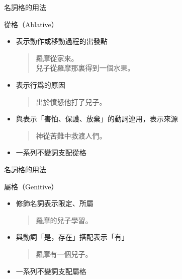 \documentclass[aspectratio=169]{beamer}
\begin{document}
\begin{frame}{名詞格的用法}
    \begin{block}{從格（Ablative）}
        \begin{itemize}
            \item 表示動作或移動過程的出發點\\
            \begin{quotation}
                \rmfamily
                 羅摩從家來。\\
                 兒子從羅摩那裏得到一個水果。
            \end{quotation}
            \item 表示行爲的原因\\
            \begin{quotation}
                \rmfamily
                 出於憤怒他打了兒子。
            \end{quotation}
            \item 與表示「害怕、保護、放棄」的動詞連用，表示來源\\
            \begin{quotation}
                \rmfamily
                 神從苦難中救渡人們。
            \end{quotation}
            \item 一系列不變詞支配從格
        \end{itemize}
    \end{block}
\end{frame}

\begin{frame}{名詞格的用法}
    \begin{block}{屬格（Genitive）}
        \begin{itemize}
            \item 修飾名詞表示限定、所屬\\
            \begin{quotation}
                \rmfamily
                 羅摩的兒子學習。
            \end{quotation}
            \item 與動詞「是，存在」搭配表示「有」\\
            \begin{quotation}
                \rmfamily
                 羅摩有一個兒子。
            \end{quotation}
            \item 一系列不變詞支配屬格
        \end{itemize}
    \end{block}
\end{frame}
\end{document}
